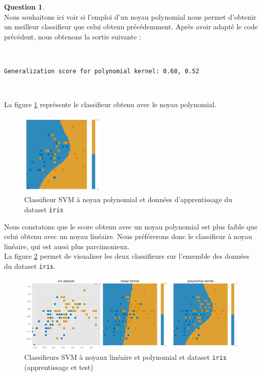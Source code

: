 \documentclass[11pt,a4paper]{article}
\theoremstyle{definition}
\newtheorem{Qu}{Question}
\begin{document}
\begin{Qu}~\\

Nous souhaitons ici voir si l'emploi d'un noyau polynomial nous permet d'obtenir un meilleur classifieur que celui obtenu précédemment. Après avoir adapté le code précédent, nous obtenons la sortie suivante :

\

\texttt{Generalization score for polynomial kernel: 0.68, 0.52 }

\

La figure \ref{qu2} représente le classifieur obtenu avec le noyau polynomial.

\begin{figure}[h!]\centering
\includegraphics[width=4cm]{Images/qu2.png}
\caption{Classifieur SVM à noyau polynomial et données d'apprentissage du dataset \texttt{iris}}
\label{qu2}
\end{figure}


Nous constatons que le score obtenu avec un noyau polynomial est plus faible que celui obtenu avec un noyau linéaire. Nous préférerons donc le classifieur à noyau linéaire, qui est aussi plus parcimonieux. \\
 La figure \ref{comp} permet de visualiser  les deux classifieurs sur l'ensemble des données du dataset \texttt{iris}. 
 
\begin{figure}[h!]\centering
\includegraphics[width=16cm]{Images/comparaison.png}
\caption{Classifieurs SVM à noyaux linéaire et polynomial et dataset \texttt{iris} (apprentissage et test)}
\label{comp}
\end{figure}
 
\end{Qu}
\end{document}
